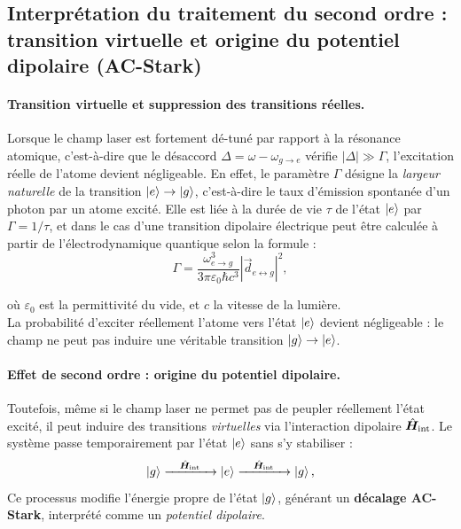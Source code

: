 \subsection{Interprétation du traitement du second ordre : transition virtuelle et origine du potentiel dipolaire (AC-Stark)}

\paragraph{Transition virtuelle et suppression des transitions réelles.}
Lorsque le champ laser est fortement dé-tuné par rapport à la résonance atomique, c’est-à-dire que le désaccord \( \Delta = \omega - \omega_{g\rightarrow e} \) vérifie \( |\Delta| \gg \Gamma \), l’excitation réelle de l’atome devient négligeable. En effet, le paramètre \( \Gamma \) désigne la \emph{largeur naturelle} de la transition \( \ket{e} \rightarrow \ket{g} \), c’est-à-dire le taux d’émission spontanée d’un photon par un atome excité. Elle est liée à la durée de vie \( \tau \) de l’état \( \ket{e} \) par \( \Gamma = 1/\tau \), et  dans le cas d’une transition dipolaire électrique  peut être calculée à partir de l’électrodynamique quantique selon la formule :
\begin{equation}
	\Gamma = \frac{\omega_{e\rightarrow g}^3}{3 \pi \varepsilon_0 \hbar c^3} |\vec{d}_{e \leftrightarrow g } |^2,
\end{equation}

où \( \varepsilon_0 \) est la permittivité du vide, et \( c \) la vitesse de la lumière.\\La probabilité d’exciter réellement l’atome vers l’état \( \ket{e} \) devient négligeable : le champ ne peut pas induire une véritable transition \( \ket{g} \to \ket{e} \).\\


\bigskip

\paragraph{Effet de second ordre : origine du potentiel dipolaire.}

\noindent Toutefois, même si le champ laser ne permet pas de peupler réellement l’état excité, il peut induire des transitions \emph{virtuelles} via l’interaction dipolaire \(  \hat{\bm{H}}_{\text{int}} \). Le système passe temporairement par l’état \( \ket{e} \) sans s’y stabiliser :
\[
\ket{g} \xrightarrow{\quad \hat{\bm{H}}_{\text{int}} \quad} \ket{e} \xrightarrow{\quad \hat{\bm{H}}_{\text{int}} \quad} \ket{g},
\]
Ce processus modifie l’énergie propre de l’état \( \ket{g} \), générant un \textbf{décalage AC-Stark}, interprété comme un \emph{potentiel dipolaire}.


